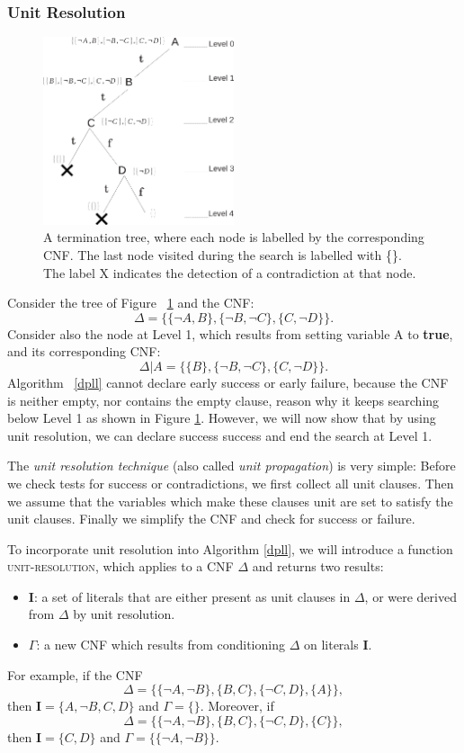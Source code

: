 \documentclass[12pt]{diicc}
\begin{document}
\subsubsection{Unit Resolution}

\begin{figure}[h!]
	\centering
		\includegraphics[width=0.5\textwidth]{termination_tree}
	\caption{A termination tree, where each node is labelled by the corresponding CNF. The last node visited during the search is labelled with \{\}. The label X indicates the detection of a contradiction at that node.}
	\label{fig:searchtree}
\end{figure}

Consider the tree of Figure ~\ref{fig:searchtree} and the CNF:
\[\Delta=\{\{\neg A,B\},\{\neg B,\neg C\},\{C,\neg D\}\}.\]
Consider also the node at Level 1, which results from setting variable A to \textbf{true}, and its corresponding CNF:
\[\Delta |A=\{\{B\},\{\neg B,\neg C\},\{C,\neg D\}\}.\]
Algorithm ~\ref{dpll} cannot declare early success or early failure, because the CNF is neither empty, nor contains the empty clause, reason why it keeps searching below Level 1 as shown in Figure \ref{fig:searchtree}. However, we will now show that by using unit resolution, we can declare success success and end the search at Level 1.

The \textit{unit resolution technique} (also called \textit{unit propagation}) is very simple: Before we check tests for success or contradictions, we first collect all unit clauses. Then we assume that the variables which make these clauses unit are set to satisfy the unit clauses. Finally we simplify the CNF and check for success or failure.

To incorporate unit resolution into Algorithm \ref{dpll}, we will introduce a function \textsc{unit-resolution}, which applies to a CNF $\Delta$ and returns two results:
\begin{itemize}
	\item \textbf{I}: a set of literals that are either present as unit clauses in $\Delta$, or were derived from $\Delta$ by unit resolution.
	\item $\Gamma$: a new CNF which results from conditioning $\Delta$ on literals \textbf{I}.
\end{itemize}
For example, if the CNF
\[\Delta=\{\{\neg A,\neg B\},\{B,C\},\{\neg C,D\},\{A\}\},\]
then $\textbf{I}=\{A,\neg B,C,D\}$ and $\Gamma=\{\}$. Moreover, if
\[\Delta=\{\{\neg A,\neg B\},\{B,C\},\{\neg C,D\},\{C\}\},\]
then $\textbf{I}=\{C,D\}$ and $\Gamma=\{\{\neg A,\neg B\}\}$.
\end{document}
